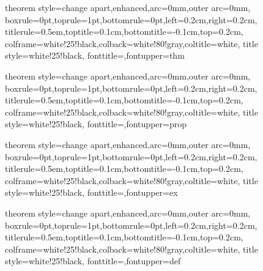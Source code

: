 

\usepackage[spanish, es-tabla]{babel}

\usepackage{tcolorbox}
{theorem style=change apart,enhanced,arc=0mm,outer arc=0mm,
    boxrule=0pt,toprule=1pt,bottomrule=0pt,left=0.2cm,right=0.2cm,
    titlerule=0.5em,toptitle=0.1cm,bottomtitle=-0.1cm,top=0.2cm,
    colframe=white!25!black,colback=white!80!gray,coltitle=white,
    title style={white!25!black},
    fonttitle=\sffamily,fontupper=\normalsize}{thm}

{theorem style=change apart,enhanced,arc=0mm,outer arc=0mm,
    boxrule=0pt,toprule=1pt,bottomrule=0pt,left=0.2cm,right=0.2cm,
    titlerule=0.5em,toptitle=0.1cm,bottomtitle=-0.1cm,top=0.2cm,
    colframe=white!25!black,colback=white!80!gray,coltitle=white,
    title style={white!25!black},
    fonttitle=\sffamily,fontupper=\normalsize}{prop}

{theorem style=change apart,enhanced,arc=0mm,outer arc=0mm,
    boxrule=0pt,toprule=1pt,bottomrule=0pt,left=0.2cm,right=0.2cm,
    titlerule=0.5em,toptitle=0.1cm,bottomtitle=-0.1cm,top=0.2cm,
    colframe=white!25!black,colback=white!80!gray,coltitle=white,
    title style={white!25!black},
    fonttitle=\sffamily,fontupper=\normalsize}{ex}

{theorem style=change apart,enhanced,arc=0mm,outer arc=0mm,
    boxrule=0pt,toprule=1pt,bottomrule=0pt,left=0.2cm,right=0.2cm,
    titlerule=0.5em,toptitle=0.1cm,bottomtitle=-0.1cm,top=0.2cm,
    colframe=white!25!black,colback=white!80!gray,coltitle=white,
    title style={white!25!black},
    fonttitle=\sffamily,fontupper=\normalsize}{def}


